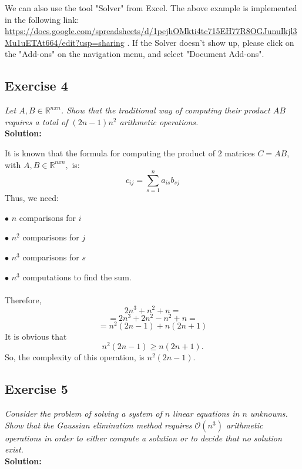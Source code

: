 \documentclass[12pt]{article}
\newcommand{\R}{\mathbb{R}}
\begin{document}
We can also use the tool "Solver" from Excel. The above example is implemented in the following link: 
\url{https://docs.google.com/spreadsheets/d/1pejhOMkti4tc715EH77R8OGJunuIkjl3Mu1uETAt664/edit?usp=sharing} . If the Solver doesn't show up, please click on the "Add-ons" on the navigation menu, and select "Document Add-ons".

\newpage


\subsection*{Exercise 4}
\textit{Let $A, B \in \R^{nxn}$. Show that the traditional way of computing their product $AB$ requires a total of $(2n-1)n^2$ arithmetic operations.}\\
\textbf{Solution:} \par
It is known that the formula for computing the product of $2$ matrices $C = AB$, with $A,B \in \R^{nxn},$ is: \\
$$c_{ij}= \sum_{s=1}^{n} a_{is}b_{sj}$$
Thus, we need: \par
$\bullet$ $n$ comparisons for $i$ \par
$\bullet$ $n^2$ comparisons for $j$ \par
$\bullet$ $n^3$ comparisons for $s$ \par
$\bullet$ $n^3$ computations to find the sum. \\ \\
Therefore, 
$$2n^3 + n^2 + n =$$
$$= 2n^3 + 2n^2 - n^2 + n =$$
$$=  n^2(2n-1) + n(2n+1) $$
It is obvious that $$n^2(2n-1) \geqslant n(2n+1).$$
So, the complexity of this operation, is $n^2(2n-1).$


\newpage


\subsection*{Exercise 5}
\textit{Consider the problem of solving a system of $n$ linear equations in  $n$ unknowns. Show that the Gaussian elimination method requires $\mathcal{O}(n^3)$ arithmetic operations in order to either compute a solution or to decide that no solution exist.}\\
\textbf{Solution:} \par
\end{document}

